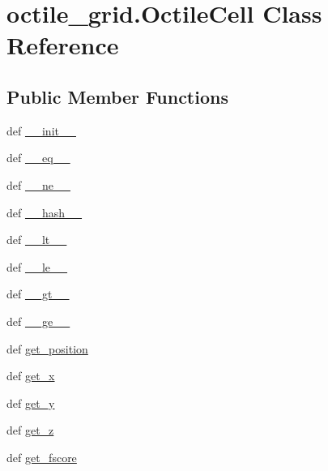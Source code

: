 \hypertarget{classoctile__grid_1_1_octile_cell}{}\section{octile\+\_\+grid.\+Octile\+Cell Class Reference}
\label{classoctile__grid_1_1_octile_cell}
\subsection*{Public Member Functions}
\begin{DoxyCompactItemize}
\item 
def \hyperlink{classoctile__grid_1_1_octile_cell_a9dbc2a58ddd25a13ee2345e2991742ae}{\+\_\+\+\_\+init\+\_\+\+\_\+}
\item 
def \hyperlink{classoctile__grid_1_1_octile_cell_a137ba11d23013bb57a33602358186101}{\+\_\+\+\_\+eq\+\_\+\+\_\+}
\item 
def \hyperlink{classoctile__grid_1_1_octile_cell_a0167cb2390eb60f6a46d533443a4f0e0}{\+\_\+\+\_\+ne\+\_\+\+\_\+}
\item 
def \hyperlink{classoctile__grid_1_1_octile_cell_a5008fbe6c3acc28675ebc986992b6f41}{\+\_\+\+\_\+hash\+\_\+\+\_\+}
\item 
def \hyperlink{classoctile__grid_1_1_octile_cell_aaa487aed2b350062ae2b12580cc1b5c6}{\+\_\+\+\_\+lt\+\_\+\+\_\+}
\item 
def \hyperlink{classoctile__grid_1_1_octile_cell_ac7171ff9d320378b4ac558559b6dc6b3}{\+\_\+\+\_\+le\+\_\+\+\_\+}
\item 
def \hyperlink{classoctile__grid_1_1_octile_cell_aa44a044572ea654bea19ebec103a20ef}{\+\_\+\+\_\+gt\+\_\+\+\_\+}
\item 
def \hyperlink{classoctile__grid_1_1_octile_cell_a6ee1fa997d630543eeb6f70b8f743c0f}{\+\_\+\+\_\+ge\+\_\+\+\_\+}
\item 
def \hyperlink{classoctile__grid_1_1_octile_cell_acc63b78398b0153bb0a9920c02959189}{get\+\_\+position}
\item 
def \hyperlink{classoctile__grid_1_1_octile_cell_aa1e109e0add5380cf6005a4e70f6d66f}{get\+\_\+x}
\item 
def \hyperlink{classoctile__grid_1_1_octile_cell_aeba67d4ec83d0848683e6bef8e10dcbf}{get\+\_\+y}
\item 
def \hyperlink{classoctile__grid_1_1_octile_cell_a5787a02d32d55713693356a68bb123ca}{get\+\_\+z}
\item 
def \hyperlink{classoctile__grid_1_1_octile_cell_aede4845b54c5799e59d9bb8b29d353cd}{get\+\_\+fscore}

\end{DoxyCompactItemize}
